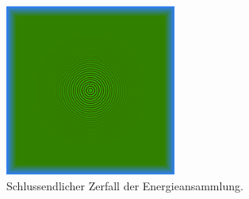 \begin{figure}
    \begin{center}
        \includegraphics[width=0.5\textwidth]{papers/particles/figures/wavesim/particle_initial_state.png}
        \caption{Schlussendlicher Zerfall der Energieansammlung.\ }\label{particles:fig:partikel:abnehmen:zerfall}
    \end{center}
\end{figure}